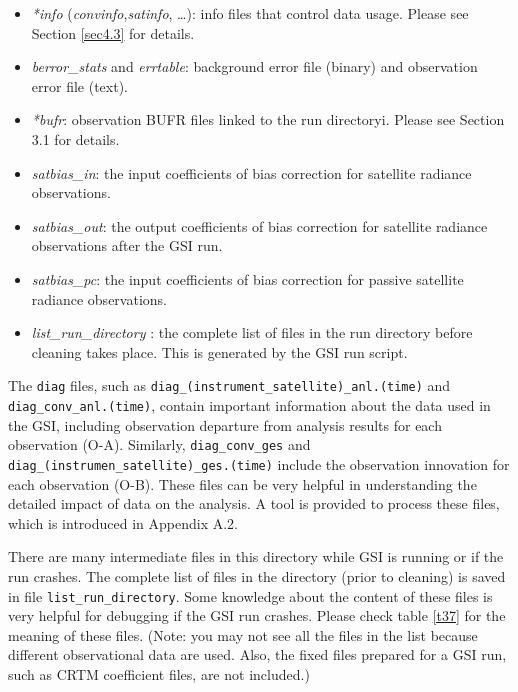 \begin{itemize}
\item \textit{*info} (\textit{convinfo},\textit{satinfo}, \dots): info files that control data usage. Please see Section \ref{sec4.3} for details.
\item \textit{berror\_stats} and \textit{errtable}: background error file (binary) and observation error file (text).
\item \textit{*bufr}: observation BUFR files linked to the run directoryi. Please see Section 3.1 for details.
\item \textit{satbias\_in}: the input coefficients of bias correction for satellite radiance observations.
\item \textit{satbias\_out}: the output coefficients of bias correction for satellite radiance observations after the GSI run.
\item \textit{satbias\_pc}: the input coefficients of bias correction for passive satellite radiance observations.
\item \textit{list\_run\_directory} : the complete list of files in the run directory before cleaning takes place. This is generated by the GSI run script.
\end{itemize}

The \verb|diag| files, such as \verb|diag_(instrument_satellite)_anl.(time)| and \verb|diag_conv_anl.(time)|, contain important information about the data used in the GSI, including observation departure from analysis results for each observation (O-A). Similarly, \verb|diag_conv_ges| and \verb|diag_(instrumen_satellite)_ges.(time)| include the observation innovation for each observation (O-B). These files can be very helpful in understanding the detailed impact of data on the analysis. A tool is provided to process these files, which is introduced in Appendix A.2.

There are many intermediate files in this directory while GSI is running or if the run crashes.  The complete list of files in the directory (prior to cleaning) is saved in file \verb|list_run_directory|. Some knowledge about the content of these files is very helpful for debugging if the GSI run crashes. Please check table \ref{t37} for the meaning of these files. (Note: you may not see all the files in the list because different observational data are used. Also, the fixed files prepared for a GSI run, such as CRTM coefficient files, are not included.) 

